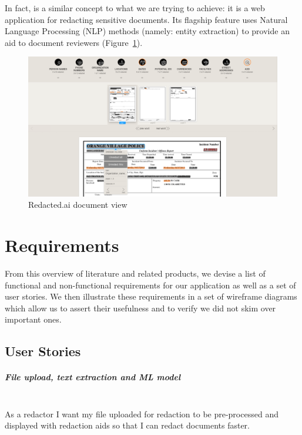 \documentclass[\version]{l4proj}
\begin{document}
In fact, \textcite{RedactedAIRemovea} is a similar concept to what we are trying to achieve: it is a web application for redacting sensitive documents. Its flagship feature uses Natural Language Processing (NLP) methods (namely: entity extraction) to provide an aid to document reviewers (Figure~\ref{fig:redactedai}).

\begin{figure}[H]
    \centering
    \includegraphics[width=\linewidth]{images/related_products/redactedai.png}
    \caption{Redacted.ai document view}\label{fig:redactedai}
\end{figure}

\chapter{Requirements}

From this overview of literature and related products, we devise a list of functional and non-functional requirements for our application as well as a set of user stories.
We then illustrate these requirements in a set of wireframe diagrams which allow us to assert their usefulness and to verify we did not skim over important ones.

\section{User Stories}

\paragraph*{File upload, text extraction and ML model}\mbox{}\\
As a redactor I want my file uploaded for redaction to be pre-processed and displayed with redaction aids so that I can redact documents faster.
\end{document}
